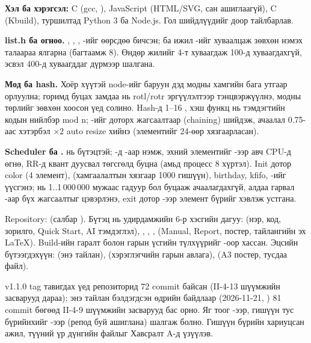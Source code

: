 
\textbf{Хэл ба хэрэгсэл:} C (gcc, ), JavaScript (HTML/SVG, сан ашиглаагүй),  C (Kbuild), туршилтад Python 3 ба Node.js. Гол шийдлүүдийг доор тайлбарлав.

\textbf{list.h ба огноо.} , , , -ийг өөрсдөө бичсэн;  ба  ижил -ийг хуваалцаж зөвхөн нэмэх талаараа ялгарна (багтаамж 8). Өндөр жилийг 4-т хуваагдаж 100-д хуваагдахгүй, эсвэл 400-д хуваагддаг дүрмээр шалгана.

\textbf{Мод ба hash.} Хоёр хүүтэй node-ийг баруун дэд модны хамгийн бага утгаар орлуулна;  горимд буцах замдаа  нь rotl/rotr эргүүлэлтээр тэнцвэржүүлнэ, модны төрлийг зөвхөн хоосон үед солино. Hash-д 1--16 , хэш функц нь тэмдэгтийн кодын нийлбэр mod n; -ийг  доторх  жагсаалтаар (chaining) шийдэж, ачаалал 0.75-аас хэтэрбэл  $\times$2 auto resize хийнэ (элементийг 24-өөр хязгаарласан).

\textbf{Scheduler ба .}  нь  бүтэцтэй; -д -аар нэмж, эхний элементийг -ээр авч CPU-д өгнө, RR-д квант дуусвал төгсгөлд буцна (амьд процесс 8 хүртэл). Init дотор color (4 элемент),  (хамгаалалтын хязгаар 1000 гишүүн), birthday, kfifo, -ийг үүсгэнэ;  нь 1..1\,000\,000 мужаас гадуур бол  буцааж ачаалагдахгүй,  алдаа гарвал -аар бүх жагсаалтыг цэвэрлэнэ, exit дотор -ээр элемент бүрийг хэвлэж устгана.


Repository:  (салбар ). Бүтэц нь удирдамжийн 6-р хэсгийн дагуу:  (нэр, код, зорилго, Quick Start, AI тэмдэглэл), , , ,  (Manual, Report, постер, тайлангийн эх LaTeX). Build-ийн гаралт болон гарын үсгийн түлхүүрийг -оор хассан. Эцсийн бүтээгдэхүүн:  (энэ тайлан),  (хэрэглэгчийн гарын авлага),  (A3 постер, тусдаа файл).

v1.1.0 tag тавигдах үед репозиторид 72 commit байсан (II-4-13 шүүмжийн засварууд дараа); энэ тайлан бэлдэгдсэн өдрийн байдлаар (2026-11-21, ) 81 commit бөгөөд II-4-9 шүүмжийн засварууд бас орно. Яг тоог -ээр, гишүүн тус бүрийнхийг -ээр (репод буй  ашиглана) шалгаж болно. Гишүүн бүрийн хариуцсан ажил, түүний үр дүнгийн файлыг Хавсралт A-д үзүүлэв.

